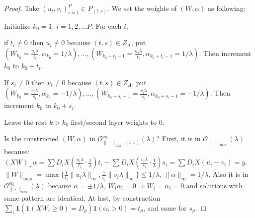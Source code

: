 \documentclass{article}
\newcommand{\eq}{\mathrm{eq}}      %
\begin{document}
\begin{proof}
Take $(u_i, v_i)_{i=1}^P \in P_{(t, s)}$. We set the weights of $(W, \alpha)$ as following:

Initialize $k_0 = 1$. $i = 1, 2, ... P$. For each $i$,

if $t_i \ne 0$ then $u_i \neq 0$ because $(t,s) \in Z_A$, put $(W_{k_0} = \frac{u_i \lambda}{t_i}, \alpha_{k_0} = 1/\lambda), \dots, (W_{k_0+t_i-1} = \frac{u_i \lambda}{t_i}, \alpha_{k_0+t_i-1} = 1/\lambda)$. Then increment $k_0$ to $k_0 + t_i$.

If $s_i \ne 0$ then $v_i \neq 0$ because $(t,s) \in Z_A$, put $(W_{k_0} = \frac{v_i \lambda}{s_i}, \alpha_{k_0} = -1/\lambda), \dots, (W_{k_0+s_i-1} = \frac{v_i \lambda}{s_i}, \alpha_{k_0+s_i-1} = -1/\lambda)$. Then increment $k_0$ to $k_0 + s_i$.

Leave the rest $k > k_0$ first/second layer weights to 0.

Is the constructed $(W, \alpha)$ in $\mathcal{O}_{\|\cdot\|_{\max}, (t, s)}^{\eq}(\lambda)$? First, it is in $\mathcal{O}_{\|\cdot\|_{\max}}(\lambda)$ because:
$(XW)_+ \alpha = \sum D_i X (\frac{u_i \lambda}{t_i} \cdot \frac{1}{\lambda}) t_i - \sum D_i X (\frac{v_i \lambda}{s_i} \cdot \frac{1}{\lambda}) s_i = \sum D_i X (u_i - v_i) = y$.
$\|W\|_{\max} = \max \{ \frac{1}{t_i} \|u_i \lambda\|_\infty, \frac{1}{s_i} \|v_i \lambda\|_\infty \} \le 1/\lambda$, $\|\alpha\|_\infty = 1/\lambda$.
Also it is in $\mathcal{O}_{\|\cdot\|_{\max}}^{\eq}(\lambda)$ because $\alpha = \pm 1/\lambda$, $W_i \alpha_i = 0 \Rightarrow W_i=\alpha_i=0$ and solutions with same pattern are identical. At last, by construction $\sum_i \mathbf{1}(\mathbf{1}(XW_i \geq 0) = D_p)\mathbf{1}(\alpha_i > 0) = t_p$, and same for $s_p$.
\end{proof}
\end{document}
